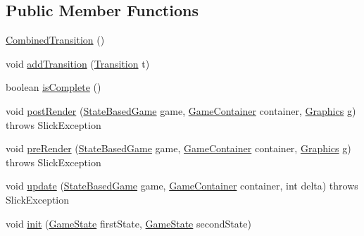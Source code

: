 \subsection*{Public Member Functions}
\begin{DoxyCompactItemize}
\item 
\mbox{\hyperlink{classorg_1_1newdawn_1_1slick_1_1state_1_1transition_1_1_combined_transition_a511392d989e61d42152634fd7df72d23}{Combined\+Transition}} ()
\item 
void \mbox{\hyperlink{classorg_1_1newdawn_1_1slick_1_1state_1_1transition_1_1_combined_transition_afa738677ed94e8507bd452d1ed88b1bd}{add\+Transition}} (\mbox{\hyperlink{interfaceorg_1_1newdawn_1_1slick_1_1state_1_1transition_1_1_transition}{Transition}} t)
\item 
boolean \mbox{\hyperlink{classorg_1_1newdawn_1_1slick_1_1state_1_1transition_1_1_combined_transition_a8c5e343409337ff699285e29ca8ec457}{is\+Complete}} ()
\item 
void \mbox{\hyperlink{classorg_1_1newdawn_1_1slick_1_1state_1_1transition_1_1_combined_transition_a31b265b22a85d140c70135142e499a81}{post\+Render}} (\mbox{\hyperlink{classorg_1_1newdawn_1_1slick_1_1state_1_1_state_based_game}{State\+Based\+Game}} game, \mbox{\hyperlink{classorg_1_1newdawn_1_1slick_1_1_game_container}{Game\+Container}} container, \mbox{\hyperlink{classorg_1_1newdawn_1_1slick_1_1_graphics}{Graphics}} g)  throws Slick\+Exception 
\item 
void \mbox{\hyperlink{classorg_1_1newdawn_1_1slick_1_1state_1_1transition_1_1_combined_transition_ae98ecdbd92ff9280e4d1c7a9cb2c52a4}{pre\+Render}} (\mbox{\hyperlink{classorg_1_1newdawn_1_1slick_1_1state_1_1_state_based_game}{State\+Based\+Game}} game, \mbox{\hyperlink{classorg_1_1newdawn_1_1slick_1_1_game_container}{Game\+Container}} container, \mbox{\hyperlink{classorg_1_1newdawn_1_1slick_1_1_graphics}{Graphics}} g)  throws Slick\+Exception 
\item 
void \mbox{\hyperlink{classorg_1_1newdawn_1_1slick_1_1state_1_1transition_1_1_combined_transition_a2cabd31a15e0fcddff1bcea6690fab6e}{update}} (\mbox{\hyperlink{classorg_1_1newdawn_1_1slick_1_1state_1_1_state_based_game}{State\+Based\+Game}} game, \mbox{\hyperlink{classorg_1_1newdawn_1_1slick_1_1_game_container}{Game\+Container}} container, int delta)  throws Slick\+Exception 
\item 
void \mbox{\hyperlink{classorg_1_1newdawn_1_1slick_1_1state_1_1transition_1_1_combined_transition_add47b8016bc87384ec197ba6923d1438}{init}} (\mbox{\hyperlink{interfaceorg_1_1newdawn_1_1slick_1_1state_1_1_game_state}{Game\+State}} first\+State, \mbox{\hyperlink{interfaceorg_1_1newdawn_1_1slick_1_1state_1_1_game_state}{Game\+State}} second\+State)
\end{DoxyCompactItemize}
